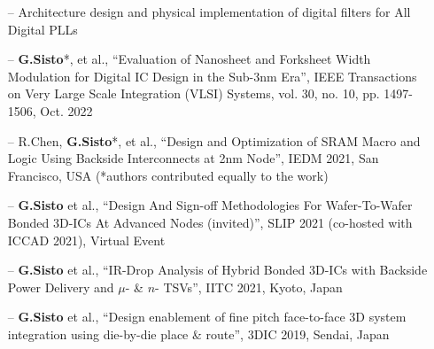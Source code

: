 \documentclass[10pt,a4paper,fancychapters]{altacv}
\begin{document}


\begin{itemize}
    \setlength{\itemindent}{0.5em}
    \item[--]  \small {Architecture design and physical implementation of digital filters for All Digital PLLs}
    
\end{itemize}



\begin{fullwidth}
\begin{itemize}
    \setlength{\itemindent}{0.5em}
    \item[--] \small{\textbf{G.Sisto}*,  et al., ``Evaluation of Nanosheet and Forksheet Width Modulation for Digital IC
    Design in the Sub-3nm Era'', IEEE Transactions on Very Large Scale Integration (VLSI) Systems, vol. 30, no. 10, pp.
    1497-1506, Oct. 2022} 
    \item[--] \small{R.Chen, \textbf{G.Sisto}*,  et al., ``Design and Optimization of SRAM Macro and Logic Using Backside
    Interconnects at 2nm Node'', IEDM 2021, San Francisco, USA (*authors contributed equally to the work)} 
    \item[--] \small{\textbf{G.Sisto}  et al., ``Design And Sign-off Methodologies For
    Wafer-To-Wafer Bonded 3D-ICs At Advanced Nodes (invited)'', SLIP 2021 (co-hosted with ICCAD 2021), Virtual Event}
    \item[--] \small{\textbf{G.Sisto} et al., ``IR-Drop Analysis of Hybrid Bonded 3D-ICs with Backside Power Delivery and $\mu$- \& $n$- TSVs'', IITC 2021, Kyoto, Japan} 
    \item[--] \small{\textbf{G.Sisto} et al., ``Design enablement of fine pitch face-to-face 3D system integration using die-by-die place \& route'', 3DIC 2019, Sendai, Japan}
\end{itemize}
\end{fullwidth}
\end{document}

